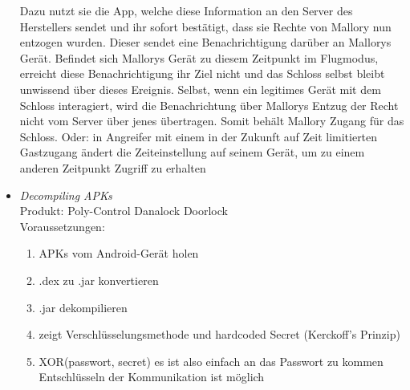 \begin{itemize}[leftmargin=0cm,label={}]
                Dazu nutzt sie die App, welche diese Information an den Server des Herstellers sendet und ihr sofort bestätigt, dass sie Rechte von Mallory nun entzogen wurden. 
                Dieser sendet eine Benachrichtigung darüber an Mallorys Gerät. 
                Befindet sich Mallorys Gerät zu diesem Zeitpunkt im Flugmodus, erreicht diese Benachrichtigung ihr Ziel nicht und das Schloss selbst bleibt unwissend über dieses Ereignis. 
                Selbst, wenn ein legitimes Gerät mit dem Schloss interagiert, wird die Benachrichtung über Mallorys Entzug der Recht nicht vom Server über jenes übertragen.
                Somit behält Mallory Zugang für das Schloss. 
                Oder: in Angreifer mit einem in der Zukunft auf Zeit limitierten Gastzugang ändert die Zeiteinstellung auf seinem Gerät, um zu einem anderen Zeitpunkt Zugriff zu erhalten
            \item \emph{Decompiling APKs}\cite{Rose2016}\\
                Produkt: Poly-Control Danalock Doorlock\\
                Voraussetzungen: \\  
                \begin{enumerate}[noitemsep]
    	            \item APKs vom Android-Gerät holen
    	            \item .dex zu .jar konvertieren
    	            \item .jar dekompilieren
    	            \item zeigt Verschlüsselungsmethode und hardcoded Secret (Kerckoff's Prinzip)
    	            \item XOR(passwort, secret) \textrightarrow es ist also einfach an das Passwort zu kommen \textrightarrow Entschlüsseln der Kommunikation ist möglich
    	        \end{enumerate}
        \end{itemize}
        
